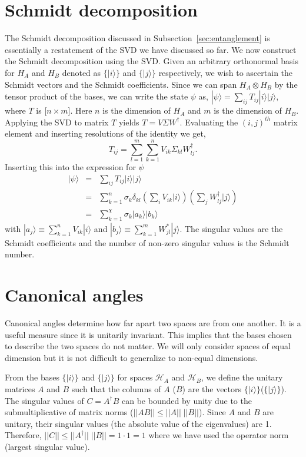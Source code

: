 \documentclass[11pt,oneside,final]{huthesis}%
\begin{document}
\section{Schmidt decomposition}
The Schmidt decomposition discussed in Subsection~\ref{sec:entanglement} is essentially a restatement of the SVD we have discussed so far.  We now construct the Schmidt decomposition using the SVD. Given an arbitrary orthonormal basis for $H_A$ and $H_B$ denoted as $\{|i\rangle\}$ and $\{|j\rangle\}$ respectively, we wish to ascertain the Schmidt vectors and the Schmidt coefficients. Since we can span $H_A\otimes H_B$ by the tensor product of the bases, we can write the state $\psi$ as, $|\psi\rangle=\sum_{ij}T_{ij}|i\rangle|j\rangle$, where $T$ is [$n\times m]$. Here $n$ is the dimension of $H_A$ and $m$ is the dimension of $H_B$. Applying the SVD to matrix $T$ yields $T=V\Sigma W^\dagger$.  Evaluating the $(i,j)^{th}$ matrix element and inserting resolutions of the identity we get, 
\[T_{ij}=\sum_{l=1}^m\sum_{k=1}^nV_{ik}\Sigma_{kl}W^\dagger_{lj}.\]
Inserting this into the expression for $\psi$ 
\begin{eqnarray*} 
|\psi\rangle&=&\sum_{ij}T_{ij}|i\rangle|j\rangle\\ 
&=&\sum_{k=1}^n \sigma_{k}\delta_{kl} \left(\sum_iV_{ik}|i\rangle\right) \left(\sum_jW^\dagger_{lj}|j\rangle\right) \\
&=&\sum_{k=1}^\chi\sigma_k|a_k\rangle|b_k\rangle 
\end{eqnarray*} 
with $|a_j\rangle\equiv\sum_{k=1}^nV_{ik}|i\rangle$ and $|b_j\rangle\equiv\sum_{k=1}^mW_{jl}^*|j\rangle$.  The singular values are the Schmidt coefficients and the number of non-zero singular values is the Schmidt number. 

\section{Canonical angles}\label{sec:cangles}
Canonical angles determine how far apart two spaces are from one another.  It is a useful measure since it is unitarily invariant.  This implies that the bases chosen to describe the two spaces do not matter.  We will only consider spaces of equal dimension but it is not difficult to generalize to non-equal dimensions. 

From the bases $\{|i\rangle\}$ and $\{|j\rangle\}$ for spaces $\mathcal{H}_A$ and $\mathcal{H}_B$, we define the unitary matrices $A$ and $B$ such that the columns of $A$ ($B$) are the vectors $\{|i\rangle\}$($\{|j\rangle\}$). The singular values of $C=A^\dagger B$ can be bounded by unity due to the submultiplicative of matrix norms ($|| AB|| \leq|| A|| \;|| B||  $).  Since $A$ and $B$ are unitary, their singular values (the absolute value of the eigenvalues) are 1. Therefore, $|| C|| \leq|| A^\dagger|| \;|| B|| =1\cdot 1=1$ where we have used the operator norm (largest singular value).  
\end{document}
